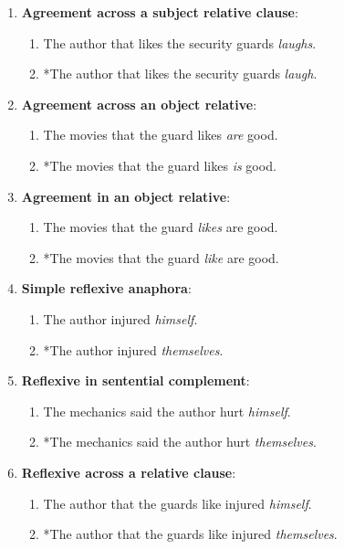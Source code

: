 \begin{enumerate}[noitemsep]
\begin{enumerate}
    \end{enumerate}
  \item \textbf{Agreement across a subject relative clause}:
    \begin{enumerate}
      \item The author that likes the security guards \textit{laughs}.
      \item *The author that likes the security guards \textit{laugh}.
    \end{enumerate}
  \item \textbf{Agreement across an object relative}:
    \begin{enumerate}
      \item The movies that the guard likes \textit{are} good.
      \item *The movies that the guard likes \textit{is} good.
    \end{enumerate}
  \item \textbf{Agreement in an object relative}:
    \begin{enumerate}
      \item The movies that the guard \textit{likes} are good.
      \item *The movies that the guard \textit{like} are good.
    \end{enumerate}
  \item \textbf{Simple reflexive anaphora}:
    \begin{enumerate}
      \item The author injured \textit{himself}.
      \item *The author injured \textit{themselves}.
    \end{enumerate}
  \item \textbf{Reflexive in sentential complement}:
    \begin{enumerate}
      \item The mechanics said the author hurt \textit{himself}.
      \item *The mechanics said the author hurt \textit{themselves}.
    \end{enumerate}
  \item \textbf{Reflexive across a relative clause}:
    \begin{enumerate}
      \item The author that the guards like injured \textit{himself}.
      \item *The author that the guards like injured \textit{themselves}.
    \end{enumerate}

\end{enumerate}
